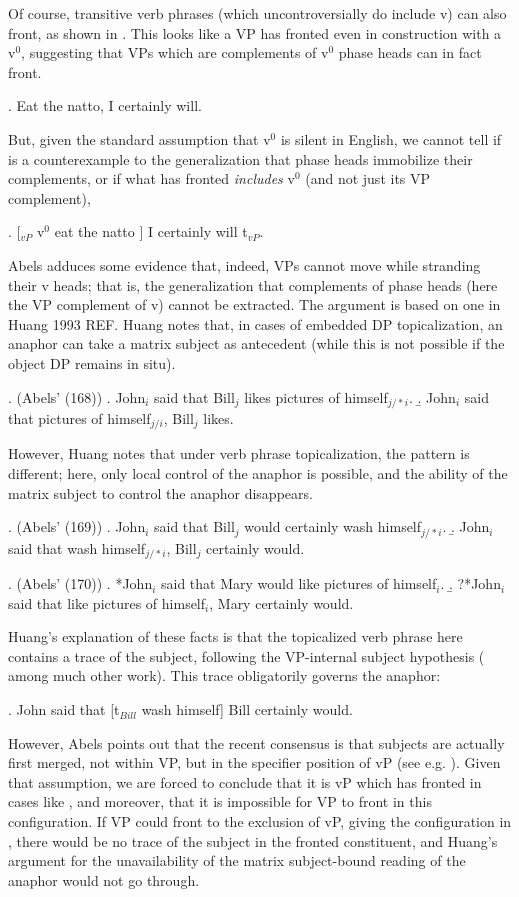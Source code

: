 \documentclass[11pt,letterpaper]{article}
\begin{document}
 Of course, transitive verb phrases (which uncontroversially do include v) can also front, as shown in \Next.
 This looks like a VP has fronted even in construction with a v$^0$, suggesting that VPs which are complements of v$^0$ phase heads can in fact front.
 
 \ex. 	Eat the natto, I certainly will.
 
 But, given the standard assumption that v$^0$ is silent in English, we cannot tell if \Last is a counterexample to the generalization that phase heads immobilize their complements, or if what has fronted \emph{includes} v$^0$ (and not just its VP complement),
 
 \ex. 	[$_{vP}$ v$^0$ eat the natto ] I certainly will t$_{vP}$.
 
 Abels adduces some evidence that, indeed, VPs cannot move while stranding their v heads; that is, the generalization that complements of phase heads (here the VP complement of v) cannot be extracted.
 The argument is based on one in Huang 1993 REF. %
 Huang notes that, in cases of embedded DP topicalization, an anaphor can take a matrix subject as antecedent (while this is not possible if the object DP remains in situ).
 
 \ex. (Abels' (168))
 	\a. John$_i$ said that Bill$_j$ likes pictures of himself$_{j/*i}$.
 	\b. John$_i$ said that pictures of himself$_{j/i}$, Bill$_j$ likes.
 	
 However, Huang notes that under verb phrase topicalization, the pattern is different; here, only local control of the anaphor is possible, and the ability of the matrix subject to control the anaphor disappears.
 
 \ex. 	(Abels' (169))
 	\a. John$_i$ said that Bill$_j$ would certainly wash himself$_{j/*i}$.
 	\b. John$_i$ said that wash himself$_{j/*i}$, Bill$_j$ certainly would.
 	
 \ex. 	(Abels' (170))
 	\a. *John$_i$ said that Mary would like pictures of himself$_i$.
 	\b. ?*John$_i$ said that like pictures of himself$_i$, Mary certainly would.
 	
 Huang's explanation of these facts is that the topicalized verb phrase here contains a trace of the subject, following the VP-internal subject hypothesis (\cite{KS91} among much other work).
 This trace obligatorily governs the anaphor:
 
 \ex. 	John said that [t$_{Bill}$ wash himself] Bill certainly would.
 
 However, Abels points out that the recent consensus is that subjects are actually first merged, not within VP, but in the specifier position of vP (see e.g. \cite{Kr96}). %
 Given that assumption, we are forced to conclude that it is vP which has fronted in cases like \Last, and moreover, that it is impossible for VP to front in this configuration.
 If VP could front to the exclusion of vP, giving the configuration in \Next, there would be no trace of the subject in the fronted constituent, and Huang's argument for the unavailability of the matrix subject-bound reading of the anaphor would not go through.
 
\end{document}
